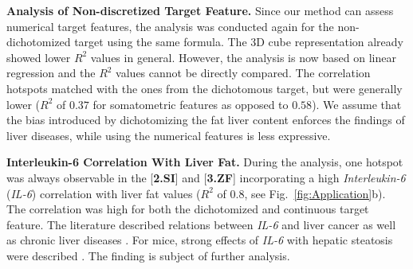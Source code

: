\documentclass[journal]{style/vgtc} 			          %
\begin{document}
%
%
%

\textbf{Analysis of Non-discretized Target Feature.}
Since our method can assess numerical target features, the analysis was conducted again for the non-dichotomized target using the same formula.
The 3D cube representation already showed lower $R^2$ values in general. However, the analysis is now based on linear regression and the $R^2$ values cannot be directly compared.
The correlation hotspots matched with the ones from the dichotomous target, but were generally lower ($R^2$ of $0.37$ for somatometric features as opposed to $0.58$).
We assume that the bias introduced by dichotomizing the fat liver content enforces the findings of liver diseases, while using the numerical features is less expressive.

\textbf{Interleukin-6 Correlation With Liver Fat.}
During the analysis, one hotspot was always observable in the [\textbf{2.SI}] and [\textbf{3.ZF}] incorporating a high \emph{Interleukin-6} (\emph{IL-6}) correlation with liver fat values ($R^2$ of $0.8$, see Fig.~\ref{fig:Application}b).
The correlation was high for both the dichotomized and continuous target feature.
The literature described relations between \emph{IL-6} and liver cancer \cite{He2013} as well as chronic liver diseases \cite{Streetz2003}.
For mice, strong effects of \emph{IL-6} with hepatic steatosis were described \cite{Hong2004}.
The finding is subject of further analysis.
\end{document}
